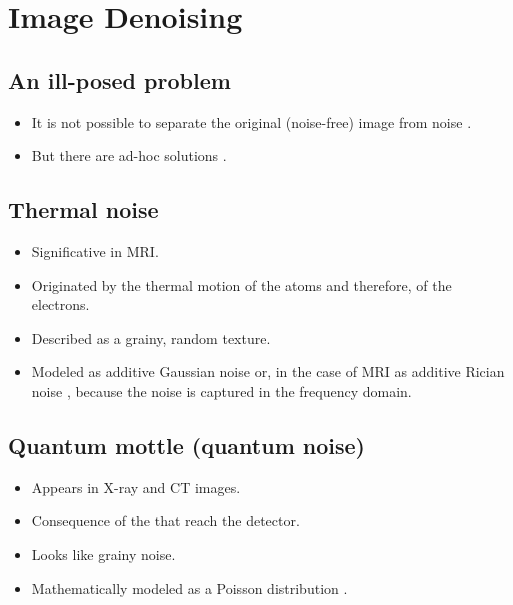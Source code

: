 \chapter{Image Denoising}

\section{An ill-posed problem}
\begin{itemize}
\item It is not possible to separate the original (noise-free) image
  from noise \cite{wikipedia_ill_posed_problem}.
\item But there are ad-hoc
    solutions \cite{wikipedia_noise_reduction}.
\end{itemize}

\section{Thermal noise}
\begin{itemize}
\item Significative in \gls{MRI}.
\item Originated by the thermal motion of the atoms and therefore, of
  the electrons.
\item Described as a grainy, random texture.
\item Modeled as additive Gaussian noise or, in the case of \gls{MRI}
  as additive Rician noise \cite{wikipedia_Rice_distribution}, because
  the noise is captured in the frequency domain.
\end{itemize}

\section{Quantum mottle (quantum noise)}
\begin{itemize}
\item Appears in X-ray and \gls{CT} images.
\item Consequence of the  that reach the detector.
\item Looks like grainy noise. 
\item Mathematically modeled as a  Poisson
  distribution \cite{wikipedia_Poisson_distribution}.
\end{itemize}

